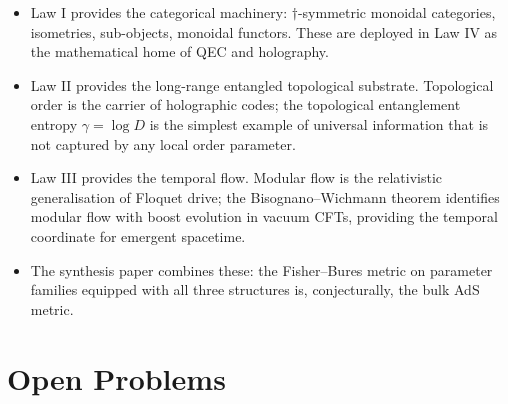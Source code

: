 \documentclass[12pt]{article}
\theoremstyle{definition}
\theoremstyle{remark}
\begin{document}
\begin{itemize}
  \item Law I provides the categorical machinery: $\dagger$-symmetric monoidal categories, isometries, sub-objects, monoidal functors. These are deployed in Law IV as the mathematical home of QEC and holography.
  \item Law II provides the long-range entangled topological substrate. Topological order is the carrier of holographic codes; the topological entanglement entropy $\gamma = \log D$ is the simplest example of universal information that is not captured by any local order parameter.
  \item Law III provides the temporal flow. Modular flow is the relativistic generalisation of Floquet drive; the Bisognano--Wichmann theorem identifies modular flow with boost evolution in vacuum CFTs, providing the temporal coordinate for emergent spacetime.
  \item The synthesis paper combines these: the Fisher--Bures metric on parameter families equipped with all three structures is, conjecturally, the bulk AdS metric.
\end{itemize}

\section{Open Problems}
\label{sec:open}
\end{document}
